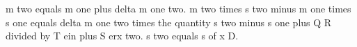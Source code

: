m two equals m one plus delta m one two.
m two times s two minus m one times s one equals delta m one two times the quantity s two minus s one plus Q R divided by T ein plus S erx two.
s two equals s of x D.